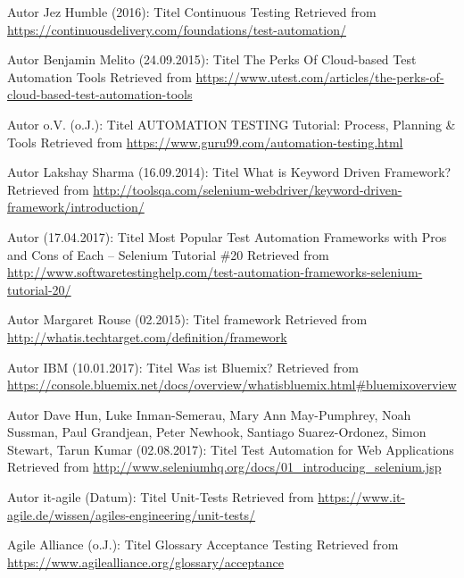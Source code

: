 \begin{thebibliography}{..........}
     Autor 	Jez Humble (2016):
							Titel	Continuous Testing
							Retrieved from \url{https://continuousdelivery.com/foundations/test-automation/} 
							
      Autor	Benjamin Melito (24.09.2015):
							Titel	The Perks Of Cloud-based Test Automation Tools
							Retrieved from \url{https://www.utest.com/articles/the-perks-of-cloud-based-test-automation-tools}

     Autor o.V. (o.J.):
							Titel	AUTOMATION TESTING Tutorial: Process, Planning \& Tools 
							Retrieved from \url{https://www.guru99.com/automation-testing.html} 


     Autor	Lakshay Sharma (16.09.2014):
							Titel	What is Keyword Driven Framework?
							Retrieved from \url{http://toolsqa.com/selenium-webdriver/keyword-driven-framework/introduction/} 

     Autor (17.04.2017):
							Titel	Most Popular Test Automation Frameworks with Pros and Cons of Each – Selenium Tutorial \#20
							Retrieved from \url{http://www.softwaretestinghelp.com/test-automation-frameworks-selenium-tutorial-20/} 

     Autor	Margaret Rouse (02.2015):
							Titel	framework 
							Retrieved from \url{http://whatis.techtarget.com/definition/framework} 

     Autor	IBM (10.01.2017):		%
							Titel	Was ist Bluemix?
							Retrieved from \url{https://console.bluemix.net/docs/overview/whatisbluemix.html#bluemixoverview} 

     Autor	Dave Hun, Luke Inman-Semerau, Mary Ann May-Pumphrey, Noah Sussman, Paul Grandjean, Peter Newhook, Santiago Suarez-Ordonez, Simon Stewart, Tarun Kumar (02.08.2017):
							Titel	Test Automation for Web Applications
							Retrieved from \url{http://www.seleniumhq.org/docs/01_introducing_selenium.jsp}
							 							  
     Autor 	it-agile (Datum):		%
							Titel	Unit-Tests
							Retrieved from \url{https://www.it-agile.de/wissen/agiles-engineering/unit-tests/} 

     Agile Alliance (o.J.):
							Titel	Glossary Acceptance Testing
							Retrieved from \url{https://www.agilealliance.org/glossary/acceptance} 


\end{thebibliography}
